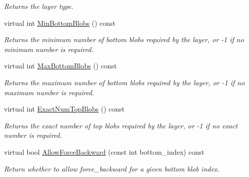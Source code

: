 \begin{DoxyCompactItemize}
\begin{DoxyCompactList}\small\item\em Returns the layer type. \end{DoxyCompactList}\item 
virtual int \hyperlink{classcaffe_1_1RecurrentLayer_a1deb403821dc383f13e8bf2a1eeafdf9}{Min\+Bottom\+Blobs} () const 
\begin{DoxyCompactList}\small\item\em Returns the minimum number of bottom blobs required by the layer, or -\/1 if no minimum number is required. \end{DoxyCompactList}\item 
virtual int \hyperlink{classcaffe_1_1RecurrentLayer_a10254a9cb58d36d029b2da9337ad16e9}{Max\+Bottom\+Blobs} () const 
\begin{DoxyCompactList}\small\item\em Returns the maximum number of bottom blobs required by the layer, or -\/1 if no maximum number is required. \end{DoxyCompactList}\item 
virtual int \hyperlink{classcaffe_1_1RecurrentLayer_ac53fa5447232a9067ef30028ad9da1cc}{Exact\+Num\+Top\+Blobs} () const 
\begin{DoxyCompactList}\small\item\em Returns the exact number of top blobs required by the layer, or -\/1 if no exact number is required. \end{DoxyCompactList}\item 
virtual bool \hyperlink{classcaffe_1_1RecurrentLayer_ac8642c8d7f418b6513c93daffa5eb15e}{Allow\+Force\+Backward} (const int bottom\+\_\+index) const 
\begin{DoxyCompactList}\small\item\em Return whether to allow force\+\_\+backward for a given bottom blob index. \end{DoxyCompactList}\end{DoxyCompactItemize}
